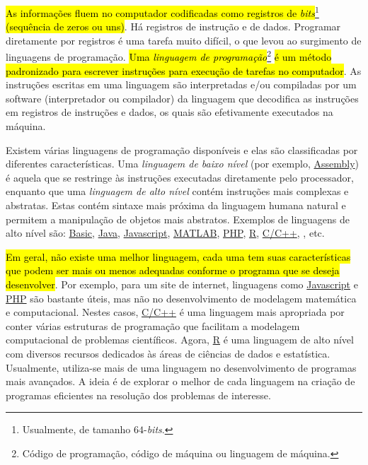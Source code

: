 \hl{As informações fluem no computador codificadas como registros de \textit{bits}}\footnote{Usualmente, de tamanho $64$-\textit{bits}.}\hl{ (sequência de zeros ou uns)}. Há registros de instrução e de dados. Programar diretamente por registros é uma tarefa muito difícil, o que levou ao surgimento de linguagens de programação. \hl{Uma \emph{linguagem de programação}}\footnote{Código de programação, código de máquina ou linguagem de máquina.}\hl{ é um método padronizado para escrever instruções para execução de tarefas no computador}. As instruções escritas em uma linguagem são interpretadas e/ou compiladas por um software (interpretador ou compilador) da linguagem que decodifica as instruções em registros de instruções e dados, os quais são efetivamente executados na máquina.

Existem várias linguagens de programação disponíveis e elas são classificadas por diferentes características. Uma \emph{linguagem de baixo nível} (por exemplo, \href{https://pt.wikipedia.org/wiki/Linguagem_assembly}{Assembly}) é aquela que se restringe às instruções executadas diretamente pelo processador, enquanto que uma \emph{linguagem de alto nível} contém instruções mais complexas e abstratas. Estas contém sintaxe mais próxima da linguagem humana natural e permitem a manipulação de objetos mais abstratos. Exemplos de linguagens de alto nível são: \href{https://pt.wikipedia.org/wiki/BASIC}{Basic}, \href{https://pt.wikipedia.org/wiki/Java\_(linguagem\_de\_programa\%C3\%A7\%C3\%A3o)}{Java}, \href{https://pt.wikipedia.org/wiki/JavaScript}{Javascript}, \href{https://pt.wikipedia.org/wiki/MATLAB}{MATLAB}, \href{https://pt.wikipedia.org/wiki/PHP}{PHP}, \href{https://pt.wikipedia.org/wiki/R\_(linguagem_de_programa\%C3\%A7\%C3\%A3o)}{R}, \href{https://pt.wikipedia.org/wiki/C\%2B\%2B}{C/C++}, {\python}, etc.

\hl{Em geral, não existe uma melhor linguagem, cada uma tem suas características que podem ser mais ou menos adequadas conforme o programa que se deseja desenvolver}. Por exemplo, para um site de internet, linguagens como \href{https://pt.wikipedia.org/wiki/JavaScript}{Javascript} e \href{https://pt.wikipedia.org/wiki/PHP}{PHP} são bastante úteis, mas não no desenvolvimento de modelagem matemática e computacional. Nestes casos, \href{https://pt.wikipedia.org/wiki/C\%2B\%2B}{C/C++} é uma linguagem mais apropriada por conter várias estruturas de programação que facilitam a modelagem computacional de problemas científicos. Agora, \href{https://pt.wikipedia.org/wiki/R\_(linguagem_de_programa\%C3\%A7\%C3\%A3o)}{R} é uma linguagem de alto nível com diversos recursos dedicados às áreas de ciências de dados e estatística. Usualmente, utiliza-se mais de uma linguagem no desenvolvimento de programas mais avançados. A ideia é de explorar o melhor de cada linguagem na criação de programas eficientes na resolução dos problemas de interesse.

